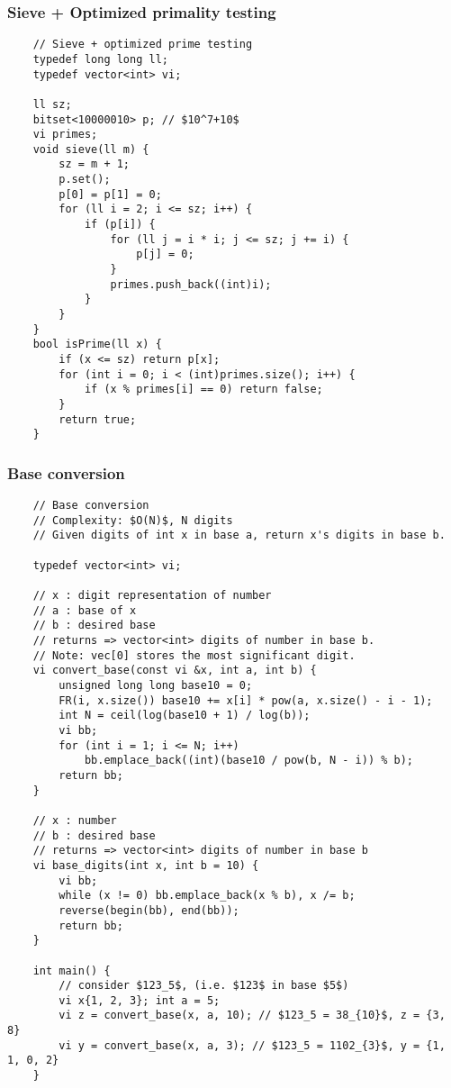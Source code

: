 \documentclass{article}
\begin{document}
\subsubsection{Sieve + Optimized primality testing}
\begin{verbatim}
    // Sieve + optimized prime testing
    typedef long long ll;
    typedef vector<int> vi;

    ll sz;
    bitset<10000010> p; // $10^7+10$
    vi primes;
    void sieve(ll m) {
        sz = m + 1;
        p.set();
        p[0] = p[1] = 0;
        for (ll i = 2; i <= sz; i++) {
            if (p[i]) {
                for (ll j = i * i; j <= sz; j += i) {
                    p[j] = 0;
                }
                primes.push_back((int)i);
            }
        }
    }
    bool isPrime(ll x) {
        if (x <= sz) return p[x];
        for (int i = 0; i < (int)primes.size(); i++) {
            if (x % primes[i] == 0) return false;
        }
        return true;
    }
\end{verbatim}

\subsubsection{Base conversion}
\begin{verbatim}
    // Base conversion
    // Complexity: $O(N)$, N digits
    // Given digits of int x in base a, return x's digits in base b.
    
    typedef vector<int> vi;

    // x : digit representation of number
    // a : base of x
    // b : desired base
    // returns => vector<int> digits of number in base b.
    // Note: vec[0] stores the most significant digit.
    vi convert_base(const vi &x, int a, int b) {
        unsigned long long base10 = 0;
        FR(i, x.size()) base10 += x[i] * pow(a, x.size() - i - 1);
        int N = ceil(log(base10 + 1) / log(b));
        vi bb;
        for (int i = 1; i <= N; i++)
            bb.emplace_back((int)(base10 / pow(b, N - i)) % b);
        return bb;
    }

    // x : number
    // b : desired base
    // returns => vector<int> digits of number in base b
    vi base_digits(int x, int b = 10) {
        vi bb;
        while (x != 0) bb.emplace_back(x % b), x /= b;
        reverse(begin(bb), end(bb));
        return bb;
    }

    int main() {
        // consider $123_5$, (i.e. $123$ in base $5$)
        vi x{1, 2, 3}; int a = 5;
        vi z = convert_base(x, a, 10); // $123_5 = 38_{10}$, z = {3, 8}
        vi y = convert_base(x, a, 3); // $123_5 = 1102_{3}$, y = {1, 1, 0, 2}
    }
\end{verbatim}
\end{document}
